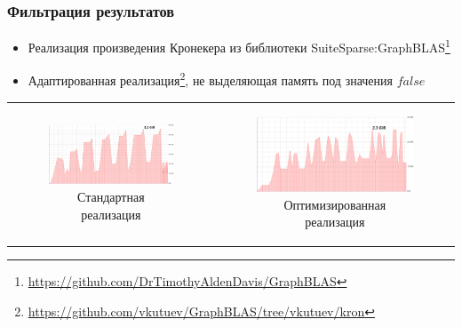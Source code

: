 \documentclass[x11names,dvipsnames,table,aspectratio=169]{beamer}
\begin{document}
\begin{frame}
  \transwipe[direction=90]
  \frametitle{Фильтрация результатов}
  \begin{itemize}
      \item Реализация произведения Кронекера из библиотеки SuiteSparse:GraphBLAS\footnote{\url{https://github.com/DrTimothyAldenDavis/GraphBLAS}}
      \item Адаптированная реализация\footnote{\url{https://github.com/vkutuev/GraphBLAS/tree/vkutuev/kron}}, не выделяющая память под значения $false$
  \end{itemize}
  \begin{tabular}{cc}
      \begin{minipage}{.48\textwidth}
      \begin{figure}
        \includegraphics[width=\textwidth]{pictures/mem_prof_base.pdf}
        \caption{Стандартная реализация}
      \end{figure}
      \end{minipage}
      &
      \begin{minipage}{.48\textwidth}
      \begin{figure}
        \includegraphics[width=\textwidth]{pictures/mem_prof_patched.pdf}
        \caption{Оптимизированная реализация}
      \end{figure}
      \end{minipage}
  \end{tabular}
  
\end{frame}
\end{document}
